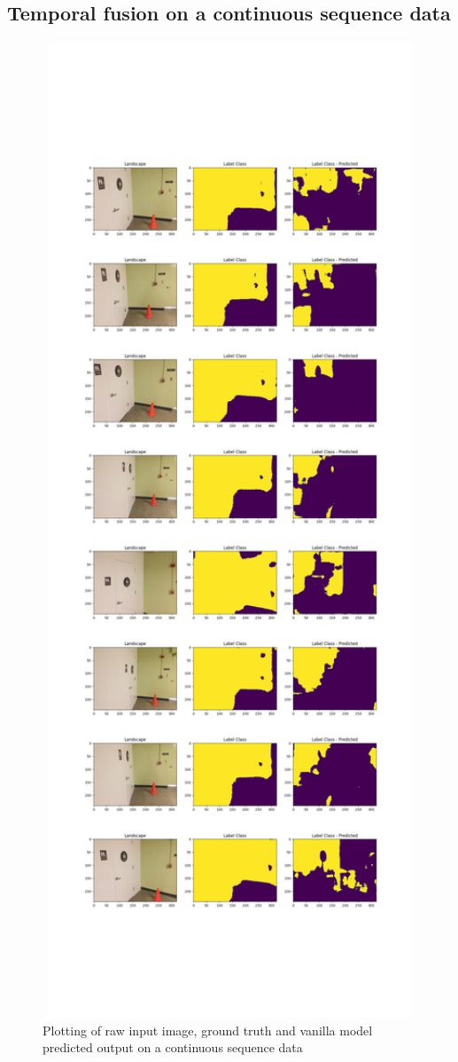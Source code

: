 	\subsection{Temporal fusion on a continuous sequence data}
	
	\begin{figure}
		\centering
		\includegraphics[width=16cm]{images/output_vanilla.png}
		\caption{Plotting of raw input image, ground truth and vanilla model predicted output on a continuous sequence data}
		\label{fig:output_vanilla}
	\end{figure}
	
